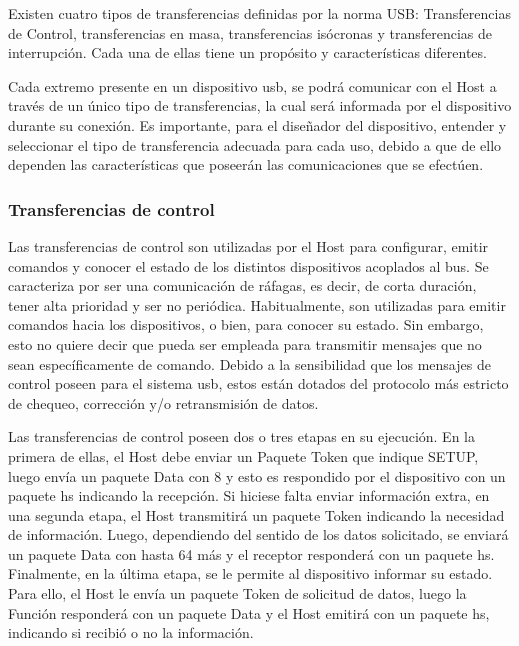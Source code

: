 Existen cuatro tipos de transferencias definidas por la norma USB: Transferencias de Control, transferencias en masa, transferencias isócronas y transferencias de interrupción. Cada una de ellas tiene un propósito y características diferentes.

Cada extremo presente en un dispositivo \acrshort{usb}, se podrá comunicar con el Host a través de un único tipo de transferencias, la cual será informada por el dispositivo durante su conexión. Es importante, para el diseñador del dispositivo, entender y seleccionar el tipo de transferencia adecuada para cada uso, debido a que de ello dependen las características que poseerán las comunicaciones que se efectúen.

\subsubsection{Transferencias de control}
	
	Las transferencias de control son utilizadas por el Host para configurar, emitir comandos y conocer el estado de los distintos dispositivos acoplados al bus. Se caracteriza por ser una comunicación de ráfagas, es decir, de corta duración, tener alta prioridad y ser no periódica. Habitualmente, son utilizadas para emitir comandos hacia los dispositivos, o bien, para conocer su estado. Sin embargo, esto no quiere decir que pueda ser empleada para transmitir mensajes que no sean específicamente de comando. Debido a la sensibilidad que los mensajes de control poseen para el sistema \acrshort{usb}, estos están dotados del protocolo más estricto de chequeo, corrección y/o retransmisión de datos.%
	
	Las transferencias de control poseen dos o tres etapas en su ejecución. En la primera de ellas, el Host debe enviar un Paquete Token que indique SETUP, luego envía un paquete Data con \SI{8}{\byte} y esto es respondido por el dispositivo con un paquete \acrshort{hs} indicando la recepción. Si hiciese falta enviar información extra, en una segunda etapa, el Host transmitirá un paquete Token indicando la necesidad de información. Luego, dependiendo del sentido de los datos solicitado, se enviará un paquete Data con hasta \SI{64}{\byte} más y el receptor responderá con un paquete \acrshort{hs}. Finalmente, en la última etapa, se le permite al dispositivo informar su estado. Para ello, el Host le envía un paquete Token de solicitud de datos, luego la Función responderá con un paquete Data y el Host emitirá con un paquete \acrshort{hs}, indicando si recibió o no la información.
	

